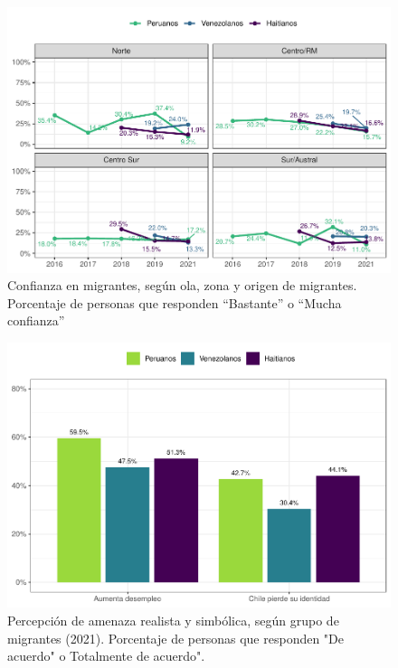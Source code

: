 \documentclass[
  12pt,
]{book}
\begin{document}
\begin{figure}

{\centering \includegraphics{reporte-elsoc_files/figure-latex/conf-zona-1} 

}

\caption{Confianza en migrantes, según ola, zona y origen de migrantes. Porcentaje de personas que responden “Bastante” o “Mucha confianza”}\label{fig:conf-zona}
\end{figure}

\begin{figure}

{\centering \includegraphics{reporte-elsoc_files/figure-latex/amen-wave-1} 

}

\caption{Percepción de amenaza realista y simbólica, según grupo de migrantes (2021). Porcentaje de personas que responden "De acuerdo" o Totalmente de acuerdo".}\label{fig:amen-wave}
\end{figure}
\end{document}
